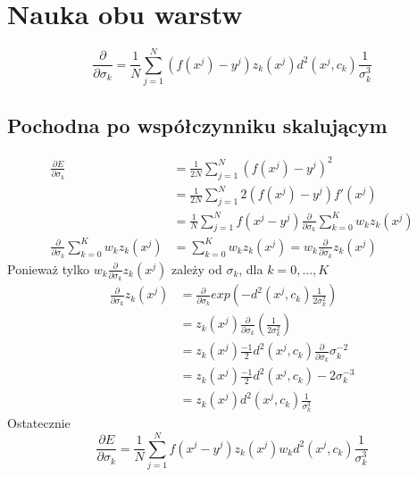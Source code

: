 \documentclass[a4paper, portrait,11pt]{article}
\begin{document}
\section{Nauka obu warstw}
\newcommand{\partialSigma}{\frac{\partial}{\partial{\sigma_{k}}}}
\begin{equation}
  \partialSigma = \frac{1}{N} \sum_{j=1}^{N}  (f(x^j) - y^j) z_k(x^j) d^2(x^j, c_k) \frac{1}{\sigma_{k}^3}
\end{equation}
\subsection{Pochodna po współczynniku skalującym}
\begin{align}
  \frac{\partial E}{\partial{\sigma_{k}}}&= \frac{1}{2N} \sum_{j=1}^{N} (f(x^j) - y^j)^2\\
  &= \frac{1}{2N} \sum_{j=1}^{N} 2 (f(x^j) - y^j) f'(x^j)\\
  &= \frac{1}{N} \sum_{j=1}^{N} f(x^j - y^j) \partialSigma \sum_{k=0}^{K} w_k z_k(x^j)\\
  \partialSigma \sum_{k=0}^{K} w_k z_k(x^j) &= \sum_{k=0}^{K} w_k z_k(x^j) =  w_k \frac{\partial}{\partial{\sigma_{k}}}z_k(x^j)
\end{align}
Ponieważ tylko $w_k \partialSigma z_k(x^j)$ zależy od $\sigma_k$, dla $k=0, ..., K$
\begin{align}
  \frac{\partial}{\partial{\sigma_{k}}}z_k(x^j) &= \partialSigma exp(-d^2(x^j, c_k) \frac{1}{2\sigma_k^2})\\
  &= z_k(x^j) \partialSigma ( \frac{1}{2\sigma_k^2}) \\
  &= z_k(x^j) \frac{-1}{2} d^2(x^j, c_k) \partialSigma {\sigma_k^{-2}}\\
  &= z_k(x^j) \frac{-1}{2} d^2(x^j, c_k) -2 \sigma_k^{-3}\\
  &= z_k(x^j) d^2(x^j, c_k) \frac{1}{\sigma_k^3}
\end{align}
Ostatecznie
\begin{equation}
  \frac{\partial E}{\partial{\sigma_{k}}} = \frac{1}{N} \sum_{j=1}^{N} f(x^j - y^j) z_k(x^j) w_k d^2(x^j, c_k) \frac{1}{\sigma_k^3}
\end{equation}
\end{document}
